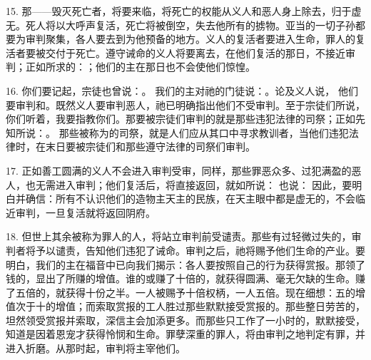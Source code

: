 15. 那——毁灭死亡者，将要来临，将死亡的权能从义人和恶人身上除去，归于虚无。死人将以大呼声复活，死亡将被倒空，失去他所有的掳物。亚当的一切子孙都要为审判聚集，各人要去到为他预备的地方。义人的复活者要进入生命，罪人的复活者要被交付于死亡。遵守诫命的义人将要离去，在他们复活的那日，不接近审判；正如所求的：；他们的主在那日也不会使他们惊惶。\par

16. 你们要记起，宗徒也曾说：。 我们的主对祂的门徒说：。论及义人说， 他们要审判和。既然义人要审判恶人，祂已明确指出他们不受审判。至于宗徒们所说，你们听着，我要指教你们。那要被宗徒们审判的就是那些违犯法律的司祭；正如先知所说：。 那些被称为的司祭，就是人们应从其口中寻求教训者，当他们违犯法律时，在末日要被宗徒们和那些遵守法律的司祭们审判。\par

17.  正如善工圆满的义人不会进入审判受审，同样，那些罪恶众多、过犯满盈的恶人，也无需进入审判；他们复活后，将直接返回，就如所说： 也说： 因此，要明白并确信：所有不认识他们的造物主天主的民族，在天主眼中都是虚无的，不会临近审判，一旦复活就将返回阴府。\par

18. 但世上其余被称为罪人的人，将站立审判前受谴责。那些有过轻微过失的，审判者将予以谴责，告知他们违犯了诫命。审判之后，祂将赐予他们生命的产业。要明白，我们的主在福音中已向我们揭示：各人要按照自己的行为获得赏报。那领了钱的，显出了所赚的增值。谁的或赚了十倍的，就获得圆满、毫无欠缺的生命。赚了五倍的，就获得十份之半。一人被赐予十倍权柄，一人五倍。现在细想：五的增值次于十的增值；而索取赏报的工人胜过那些默默接受赏报的。那些整日劳苦的，坦然领受赏报并索取，深信主会加添更多。而那些只工作了一小时的，默默接受，知道是因着恩宠才获得怜悯和生命。罪孽深重的罪人，将由审判之地判定有罪，并进入折磨。从那时起，审判将主宰他们。\par

